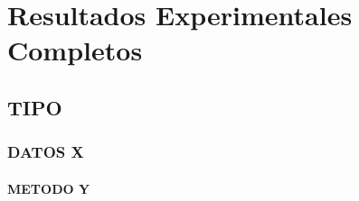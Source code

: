 \cleardoublepage
\addappheadtotoc
\appendixpage
\appendix
  \chapter{Resultados Experimentales Completos} \label{apenA}
    \section{TIPO}
      \clearpage
      \subsection{DATOS X}
	     \subsubsection{METODO Y}
	\clearpage
